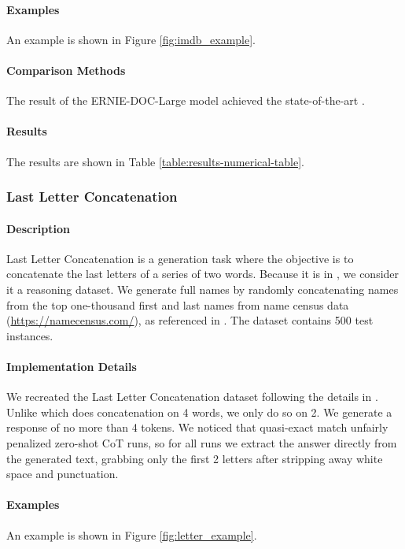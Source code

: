 \paragraph{Examples} An example is shown in Figure \ref{fig:imdb_example}.

\paragraph{Comparison Methods}
The result of the ERNIE-DOC-Large model achieved the state-of-the-art \citep{ding2021erniedoc}.

\paragraph{Results} The results are shown in Table \ref{table:results-numerical-table}.

\subsubsection{Last Letter Concatenation} 
\paragraph{Description} Last Letter Concatenation \citep{wei2023chainofthought} is a generation task where the objective is to concatenate the last letters of a series of two words. Because it is in \citet{kojima2023large}, we consider it a reasoning dataset. We generate full names by randomly concatenating names from the top one-thousand first and last names from name census data (\url{https://namecensus.com/}), as referenced in \citet{wei2023chainofthought}. The dataset contains 500 test instances.

\paragraph{Implementation Details}
We recreated the Last Letter Concatenation dataset following the details in \citet{kojima2023large, wei2023chainofthought}. Unlike \citet{kojima2023large} which does concatenation on 4 words, we only do so on 2. We generate a response of no more than 4 tokens. We noticed that quasi-exact match unfairly penalized zero-shot CoT runs, so for all runs we extract the answer directly from the generated text, grabbing only the first 2 letters after stripping away white space and punctuation.  


\paragraph{Examples} An example is shown in Figure \ref{fig:letter_example}.

